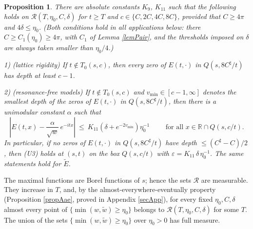 \documentclass[11pt,twoside,reqno]{amsart}
\def\ti{\tilde}
\def\R{{\mathbb R}}
\def\RR{{\mathcal{R}}}
\def\e{\varepsilon}
\def\d{\delta}
\def\a{\alpha}
\theoremstyle{plain}
\newtheorem{proposition}{Proposition}
\numberwithin{equation}{section}
\begin{document}
\begin{proposition}\label{propU3}
There are absolute constants $K_9$, $K_{11}$ such that the following holds on $\RR(T,\eta_0,C,\d)$ for $t\geq T$ and $c\in\{C,2C,4C,8C\}$, provided that $C\geq4\pi$ and $4\d\leq\eta_0$. (Both conditions hold in all applications below: there $C\geq C_1(\eta_0)\geq4\pi$, with $C_1$ of Lemma \ref{lemPair}, and the thresholds imposed on $\d$ are always taken smaller than $\eta_0/4$.)

1) {\rm(lattice rigidity)} If $t\notin T_0(s,c)$, then every zero of $E(t,\cdot)$ in $Q(s,8C^\sharp/t)$ has depth at least $c-1$.

2) {\rm(resonance-free models)} If $t\notin T_0(s,c)$ and $v_{\min}\in[c-1,\infty]$ denotes the smallest depth of the zeros of $E(t,\cdot)$ in $Q(s,8C^\sharp/t)$, then there is a unimodular constant $\a$ such that
$$\left|E(t,x)-\frac{\a}{\sqrt w}\,e^{-itx}\right|\ \leq\ K_{11}\left(\d+e^{-2v_{\min}}\right)\eta_0^{-1}
\qquad\text{ for all }x\in\R\cap Q(s,c/t).$$
In particular, if no zeros of $E(t,\cdot)$ in $Q(s,8C^\sharp/t)$ have depth $\leq(C^\sharp-C)/2$, then (U3) holds at $(s,t)$ on the box $Q(s,c/t)$ with $\e=K_{11}\,\d\,\eta_0^{-1}$. The same statements hold for $\ti E$.
\end{proposition}

The maximal functions are Borel functions of $s$; hence the sets $\RR$ are measurable. They increase in $T$, and, by the almost-everywhere-eventually property (Proposition \ref{propAae}, proved in Appendix \ref{secApp}), for every fixed $\eta_0,C,\d$ almost every point of $\{\min(w,\ti w)\geq\eta_0\}$ belongs to $\RR(T,\eta_0,C,\d)$ for some $T$. The union of the sets $\{\min(w,\ti w)\geq\eta_0\}$ over $\eta_0>0$ has full measure.
\end{document}
